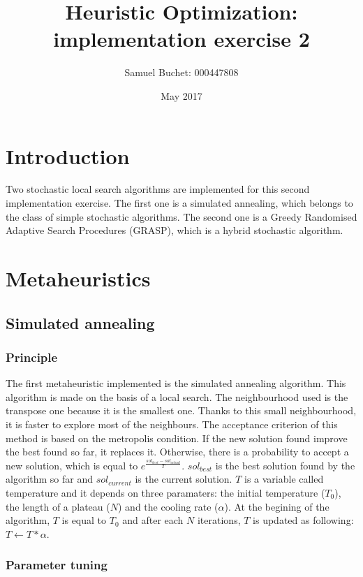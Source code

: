 \documentclass{article}
\title{Heuristic Optimization: implementation exercise 2}
\author{Samuel Buchet: 000447808}
\date{May 2017}
\begin{document}
\maketitle

\section{Introduction}

Two stochastic local search algorithms are implemented for this second implementation exercise.
The first one is a simulated annealing, which belongs to the class of simple stochastic algorithms.
The second one is a Greedy Randomised Adaptive Search Procedures (GRASP), which is a hybrid stochastic algorithm.

\section{Metaheuristics}

\subsection{Simulated annealing}

\subsubsection{Principle}

The first metaheuristic implemented is the simulated annealing algorithm.
This algorithm is made on the basis of a local search.
The neighbourhood used is the transpose one because it is the smallest one.
Thanks to this small neighbourhood, it is faster to explore most of the neighbours.
The acceptance criterion of this method is based on the metropolis condition.
If the new solution found improve the best found so far, it replaces it. Otherwise, there is a probability to accept a new solution, which is equal to $e^{ \frac{sol_{best}-sol_{actual}}{T}}$.
$sol_{best}$ is the best solution found by the algorithm so far and $sol_{current}$ is the current solution.
$T$ is a variable called temperature and it depends on three paramaters: the initial temperature ($T_0$), the length of a plateau ($N$) and the cooling rate ($\alpha$).
At the begining of the algorithm, $T$ is equal to $T_0$ and after each $N$ iterations, $T$ is updated as following: $T \leftarrow T*\alpha$.

\subsubsection{Parameter tuning}
\end{document}
